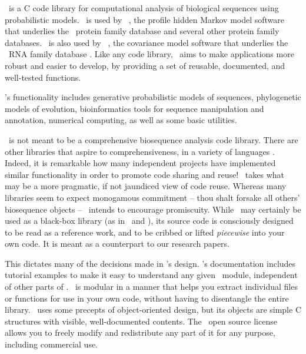 

\Easel\ is a C code library for computational analysis of biological
sequences using probabilistic models. \Easel\ is used by \HMMER\ 
\citep{hmmer,Eddy98}, the profile hidden Markov model software that
underlies the \Pfam\ protein family database
\citep{Finn06,Sonnhammer97} and several other protein family
databases. \Easel\ is also used by \Infernal\ 
\citep{infernal,NawrockiEddy07}, the covariance model software that
underlies the \Rfam\ RNA family database
\citep{Griffiths-Jones05}. Like any code library, \Easel\ aims to make
applications more robust and easier to develop, by providing a set of
reusable, documented, and well-tested functions.

\Easel's functionality includes generative probabilistic models of
sequences, phylogenetic models of evolution, bioinformatics tools for
sequence manipulation and annotation, numerical computing, as well as
some basic utilities.

\Easel\ is not meant to be a comprehensive biosequence analysis code
library. There are other libraries that aspire to comprehensiveness,
in a variety of languages
\citep{Vahrson96,Pitt01,Mangalam02,Butt05,Dutheil06,Giancarlo07,Doring08}.
Indeed, it is remarkable how many independent projects have
implemented similar functionality in order to promote code sharing and
reuse!  \Easel\ takes what may be a more pragmatic, if not jaundiced
view of code reuse.  Whereas many libraries seem to expect monogamous
commitment -- thou shalt forsake all others' biosequence objects -- 
\Easel\ intends to encourage promiscuity. While \Easel\ may certainly
be used as a black-box library (as in \HMMER\ and \Infernal), its
source code is consciously designed to be read as a reference work,
and to be cribbed or lifted \emph{piecewise} into your own code. It is
meant as a counterpart to our research papers.

This dictates many of the decisions made in \Easel's design.  \Easel's
documentation includes tutorial examples to make it easy to understand
any given \Easel\ module, independent of other parts of \Easel.
\Easel\ is modular in a manner that helps you extract individual files
or functions for use in your own code, without having to disentangle
the entire library. \Easel\ uses some precepts of object-oriented
design, but its objects are simple C structures with visible,
well-documented contents. The \Easel\ open source license allows you
to freely modify and redistribute any part of it for any purpose,
including commercial use.

